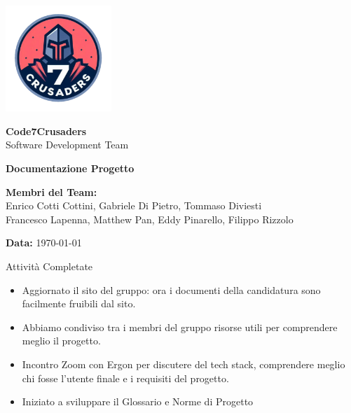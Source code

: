 \documentclass{beamer}
\begin{document}
\begin{frame}[plain] %
    \centering
    \vspace*{2cm}
    
    \includegraphics[width=0.3\textwidth]{../img/logo/7Crusaders_logo.png} %
    \vspace{1cm}
    
    {\Huge \textbf{Code7Crusaders}}\\
    \vspace{0.5cm}
    {\Large Software Development Team}\\
    \vspace{2cm}
    
    {\large \textbf{Documentazione Progetto}}\\
    \vspace{3cm}

    \textbf{Membri del Team:}\\
    Enrico Cotti Cottini, Gabriele Di Pietro, Tommaso Diviesti \\
    Francesco Lapenna, Matthew Pan, Eddy Pinarello, Filippo Rizzolo \\
    \vspace{1cm}
    
    {\large \textbf{Data:}} \today\\
    
    \vspace{1cm}
\end{frame}

\begin{frame}
    \begin{block}{Attività Completate}
        \begin{itemize}
            \item Aggiornato il sito del gruppo: ora i documenti della candidatura sono facilmente fruibili dal sito.
            \item Abbiamo condiviso tra i membri del gruppo risorse utili per comprendere meglio il progetto.
            \item Incontro Zoom con Ergon per discutere del tech stack, comprendere meglio chi fosse l'utente finale e i requisiti del progetto.
            \item Iniziato a sviluppare il Glossario e Norme di Progetto
        \end{itemize}
    \end{block}
\end{frame}
\end{document}

